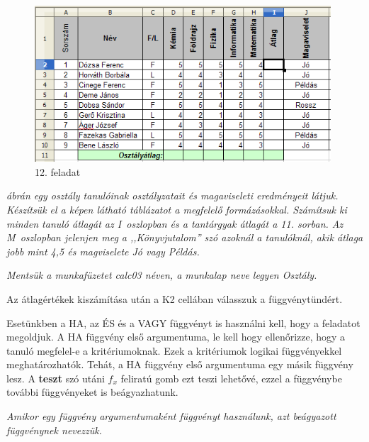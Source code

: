 \begin{figure}[!h]
\begin{center}
\includegraphics[width=11.048cm]{oocalcv2-img67.png}
\caption{12. feladat}\label{12-feladat}
\end{center}
\end{figure}

{\itshape
{} ábrán egy osztály tanulóinak osztályzatait és
magaviseleti eredményeit látjuk. Készítsük el a képen
látható táblázatot a megfelelő formázásokkal.
Számítsuk ki minden tanuló átlagát az I~oszlopban és a
tantárgyak átlagát a 11. sorban. Az M~oszlopban jelenjen meg a
,,Könyvjutalom'' szó azoknál a
tanulóknál, akik átlaga jobb mint 4,5 és magviselete Jó vagy
Példás.}

{\itshape
Mentsük a munkafüzetet calc03 néven, a munkalap neve legyen
Osztály.}

Az átlagértékek kiszámítása után a K2 cellában
válasszuk a függvénytündért. 

Esetünkben a HA, az ÉS és a VAGY függvényt is használni kell,
hogy a feladatot megoldjuk. A HA függvény első argumentuma, le
kell hogy ellenőrizze, hogy a tanuló megfelel-e a
kritériumoknak. Ezek a kritériumok logikai függvényekkel
meghatározhatók. Tehát, a HA függvény első argumentuma
egy másik függvény lesz. A \textbf{teszt} szó utáni
$f_x$ feliratú gomb
ezt teszi lehetővé, ezzel a függvénybe további
függvényeket is beágyazhatunk.

{\itshape
Amikor egy függvény argumentumaként függvényt használunk,
azt beágyazott függvénynek nevezzük.}

